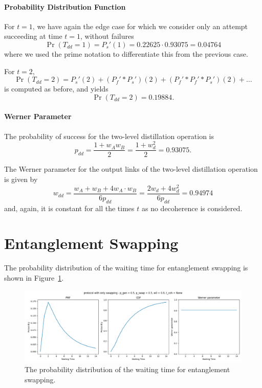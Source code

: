 \documentclass{masterthesis}
\begin{document}
\paragraph*{Probability Distribution Function}

For $t = 1$, we have again the edge case for which we consider only an attempt succeeding at time $t=1$, without failures  
\begin{equation}
    \Pr(T_{dd} = 1) = P_s'(1) = 0.22625 \cdot 0.93075 = 0.04764 
\end{equation}
where we used the prime notation to differentiate this from the previous case. 

For $t = 2$,
\begin{equation}
    \Pr(T_{dd} = 2) = P_s'(2) + (P_f' \ast P_s')(2) + (P_f' \ast P_f' \ast P_s')(2) + \ldots
\end{equation}
is computed as before, and yields
\begin{equation}
    \Pr(T_{dd} = 2) = 0.19884 .
\end{equation}

\paragraph*{Werner Parameter}

The probability of success for the two-level distillation operation is
\begin{equation}
    p_{dd} = \frac{1 + w_A w_B}{2} = \frac{1 + w_d^2}{2} = 0.93075 .
\end{equation}

The Werner parameter for the output links of the two-level distillation operation is given by
\begin{equation}
    w_{dd} = \frac{w_A + w_B + 4 w_A \cdot w_B}{6 p_{dd}} = \frac{2 w_d + 4 w_d^2}{6 p_{dd}} = 0.94974
\end{equation}
and, again, it is constant for all the times $t$ as no decoherence is considered.

\section{Entanglement Swapping}

The probability distribution of the waiting time for entanglement swapping is shown in Figure~\ref{fig:swap_waiting_time}.
\begin{figure}[ht]
    \centering
    \includegraphics[width=1\linewidth]{images/dist_tests/only swapping.png}
    \caption{The probability distribution of the waiting time for entanglement swapping.}
    \label{fig:swap_waiting_time}
\end{figure}
\end{document}
